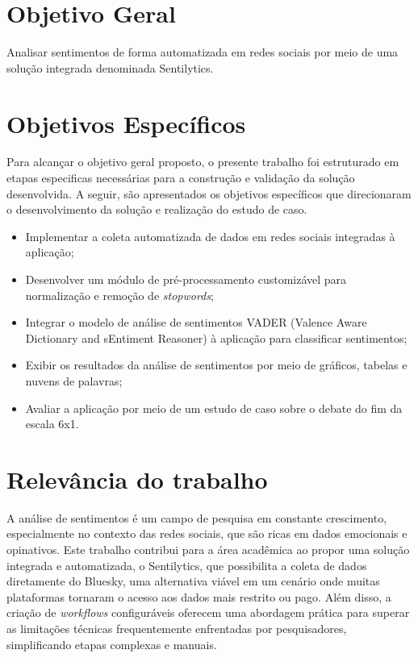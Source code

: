 \documentclass[
	12pt,				%
	oneside,			%
	a4paper,			%
	english,			%
	french,				%
	spanish,			%
	brazil				%
	]{abntex2}
\begin{document}
\hypertarget{objetivo-geral}{%
\section{Objetivo Geral}\label{objetivo-geral}}

Analisar sentimentos de forma automatizada em redes sociais por meio de
uma solução integrada denominada Sentilytics.

\hypertarget{objetivos-especuxedficos}{%
\section{Objetivos Específicos}\label{objetivos-especuxedficos}}

Para alcançar o objetivo geral proposto, o presente trabalho foi
estruturado em etapas especificas necessárias para a construção e
validação da solução desenvolvida. A seguir, são apresentados os
objetivos específicos que direcionaram o desenvolvimento da solução e
realização do estudo de caso.

\begin{itemize}
\tightlist
\item
  Implementar a coleta automatizada de dados em redes sociais integradas
  à aplicação;
\item
  Desenvolver um módulo de pré-processamento customizável para
  normalização e remoção de \emph{stopwords};
\item
  Integrar o modelo de análise de sentimentos VADER (Valence Aware
  Dictionary and sEntiment Reasoner) à aplicação para classificar
  sentimentos;
\item
  Exibir os resultados da análise de sentimentos por meio de gráficos,
  tabelas e nuvens de palavras;
\item
  Avaliar a aplicação por meio de um estudo de caso sobre o debate do
  fim da escala 6x1.
\end{itemize}

\hypertarget{relevuxe2ncia-do-trabalho}{%
\section{Relevância do trabalho}\label{relevuxe2ncia-do-trabalho}}

A análise de sentimentos é um campo de pesquisa em constante
crescimento, especialmente no contexto das redes sociais, que são ricas
em dados emocionais e opinativos. Este trabalho contribui para a área
acadêmica ao propor uma solução integrada e automatizada, o Sentilytics,
que possibilita a coleta de dados diretamente do Bluesky, uma
alternativa viável em um cenário onde muitas plataformas tornaram o
acesso aos dados mais restrito ou pago. Além disso, a criação de
\emph{workflows} configuráveis oferecem uma abordagem prática para
superar as limitações técnicas frequentemente enfrentadas por
pesquisadores, simplificando etapas complexas e manuais.
\end{document}
